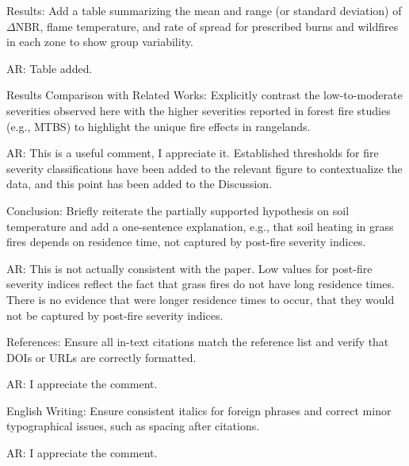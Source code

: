 \documentclass[parskip=half, american]{scrartcl}
\newcommand{\AR}[1]
	{\color{PineGreen}AR: #1\color{black} \par }
\begin{document}
Results: Add a table summarizing the mean and range (or standard deviation) of $\Delta$NBR, flame temperature, and rate of spread for prescribed burns and wildfires in each zone to show group variability.

\AR{Table added. }
	
Results Comparison with Related Works: Explicitly contrast the low-to-moderate severities observed here with the higher severities reported in forest fire studies (e.g., MTBS) to highlight the unique fire effects in rangelands.

\AR{This is a useful comment, I appreciate it. Established thresholds for fire severity classifications have been added to the relevant figure to contextualize the data, and this point has been added to the Discussion. }


Conclusion: Briefly reiterate the partially supported hypothesis on soil temperature and add a one-sentence explanation, e.g., that soil heating in grass fires depends on residence time, not captured by post-fire severity indices.

\AR{This is not actually consistent with the paper. 
	Low values for post-fire severity indices reflect the fact that grass fires do not have long residence times.
	There is no evidence that were longer residence times to occur, that they would not be captured by post-fire severity indices.  }

References: Ensure all in-text citations match the reference list and verify that DOIs or URLs are correctly formatted.

\AR{I appreciate the comment.} 

English Writing: Ensure consistent italics for foreign phrases and correct minor typographical issues, such as spacing after citations.

\AR{I appreciate the comment.} 
\end{document}
